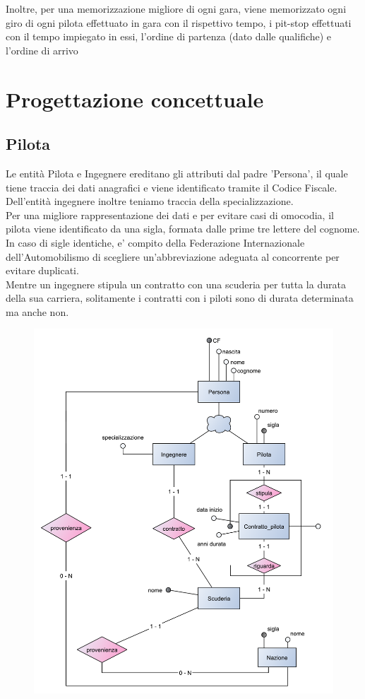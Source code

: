 \documentclass[a4paper,12pt]{report}
\begin{document}
		Inoltre, per una memorizzazione migliore di ogni gara, viene memorizzato ogni giro di ogni pilota effettuato in gara con il rispettivo tempo,
		i pit-stop effettuati con il tempo impiegato in essi, l'ordine di partenza (dato dalle qualifiche) e l'ordine di arrivo
	\chapter{Progettazione concettuale}
		\section{Pilota}
	Le entità Pilota e Ingegnere ereditano gli attributi dal padre 'Persona', il quale tiene traccia dei
	dati anagrafici e viene identificato tramite il Codice Fiscale.\\
	Dell'entità ingegnere inoltre teniamo traccia della specializzazione.\\
	Per una migliore rappresentazione dei dati e per evitare casi di omocodia, il pilota viene identificato
	da una sigla, formata dalle prime tre lettere del cognome. In caso di sigle identiche, e' compito della
	Federazione Internazionale dell'Automobilismo di scegliere un'abbreviazione adeguata al concorrente
	per evitare duplicati.\\
	Mentre un ingegnere stipula un contratto con una scuderia per tutta la durata della sua carriera,
	solitamente i contratti con i piloti sono di durata determinata ma anche non.
	\begin{figure}[htbp]
		\centering
		\includegraphics[scale=0.8]{copies/scheletro1.pdf}
	\end{figure}
\end{document}
